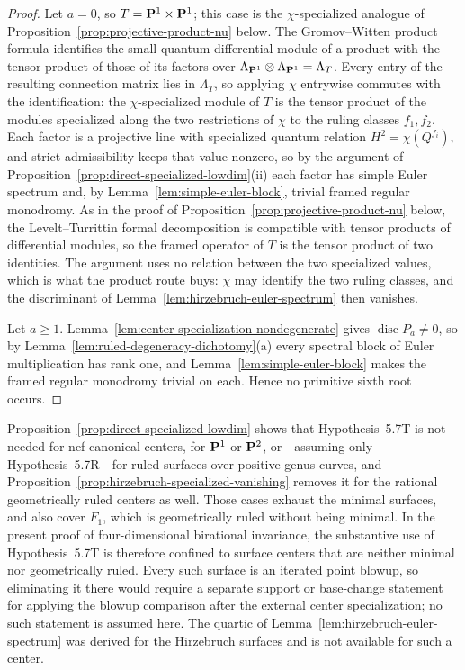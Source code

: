 \begin{proof}
Let \(a=0\), so \(T=\mathbf P^1\times\mathbf P^1\); this case is the \(\chi\)-specialized
analogue of Proposition~\ref{prop:projective-product-nu} below.  The
Gromov--Witten product formula
\cite{BehrendProduct} identifies the small quantum differential module of a
product with the tensor product of those of its factors over
\(\Lambda_{\mathbf P^1}\otimes\Lambda_{\mathbf P^1}=\Lambda_T\).  Every entry of the
resulting connection matrix lies in \(\Lambda_T\), so applying \(\chi\)
entrywise commutes with the identification: the \(\chi\)-specialized module of
\(T\) is the tensor product of the modules specialized along the two
restrictions of \(\chi\) to the ruling classes \(f_1,f_2\).  Each factor is a
projective line with specialized quantum relation \(H^2=\chi(Q^{f_i})\), and strict
admissibility keeps that value nonzero, so by the argument of
Proposition~\ref{prop:direct-specialized-lowdim}(ii) each factor has simple Euler
spectrum and, by Lemma~\ref{lem:simple-euler-block}, trivial framed regular
monodromy.  As in the proof of
Proposition~\ref{prop:projective-product-nu} below, the Levelt--Turrittin formal
decomposition is compatible with tensor products of differential modules, so the
framed operator of \(T\) is the tensor product of two identities.  The argument uses no
relation between the two specialized values, which is what the product route
buys: \(\chi\) may identify the two ruling classes, and the discriminant of
Lemma~\ref{lem:hirzebruch-euler-spectrum} then vanishes.

Let \(a\ge1\).  Lemma~\ref{lem:center-specialization-nondegenerate} gives
\(\operatorname{disc}P_a\ne0\), so by
Lemma~\ref{lem:ruled-degeneracy-dichotomy}(a) every spectral block of Euler
multiplication has rank one, and Lemma~\ref{lem:simple-euler-block} makes the
framed regular monodromy trivial on each.  Hence no primitive sixth root occurs.
\end{proof}

\begin{remark}
\label{rem:tagging-scope}
Proposition~\ref{prop:direct-specialized-lowdim} shows that
Hypothesis~5.7T is not needed for nef-canonical centers, for \(\mathbf P^1\) or
\(\mathbf P^2\), or---assuming only Hypothesis~5.7R---for ruled surfaces over
positive-genus curves, and
Proposition~\ref{prop:hirzebruch-specialized-vanishing} removes it for the
rational geometrically ruled centers as well.  Those cases exhaust the minimal
surfaces, and also cover \(F_1\), which is geometrically ruled without being
minimal.  In the present proof of four-dimensional birational invariance, the
substantive use of Hypothesis~5.7T is therefore confined to surface centers
that are neither minimal nor geometrically ruled.  Every such surface is an iterated point
blowup, so eliminating it there would require a separate support or base-change
statement for applying the blowup comparison after the external center
specialization; no such statement is assumed here.  The quartic of
Lemma~\ref{lem:hirzebruch-euler-spectrum} was derived for the Hirzebruch
surfaces and is not available for such a center.
\end{remark}

